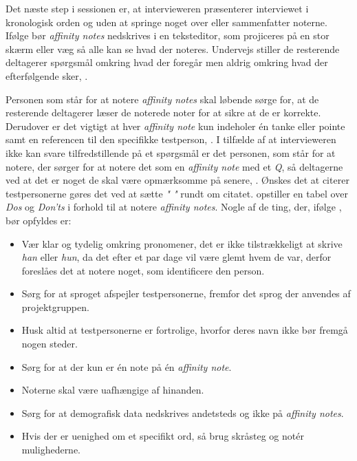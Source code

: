 Det næste step i sessionen er, at intervieweren præsenterer interviewet i kronologisk orden og uden at springe noget over eller sammenfatter noterne. Ifølge \textcite[s. 113]{Book:CIInterpretationSession} bør \textit{affinity notes} nedskrives i en teksteditor, som projiceres på en stor skærm eller væg så alle kan se hvad der noteres. Undervejs stiller de resterende deltagerer spørgsmål omkring hvad der foregår men aldrig omkring hvad der efterfølgende sker, \parencite[s. 114]{Book:CIInterpretationSession}.

Personen som står for at notere \textit{affinity notes} skal løbende sørge for, at de resterende deltagerer læser de noterede noter for at sikre at de er korrekte. Derudover er det vigtigt at hver \textit{affinity note} kun indeholer én tanke eller pointe samt en referencen til den specifikke testperson, \parencite[s. 115]{Book:CIInterpretationSession}. I tilfælde af at intervieweren ikke kan svare tilfredstillende på et spørgsmål er det personen, som står for at notere, der sørger for at notere det som en \textit{affinity note} med et \textit{Q}, så deltagerne ved at det er noget de skal være opmærksomme på senere, \parencite[s. 115]{Book:CIInterpretationSession}. Ønskes det at citerer testpersonerne gøres det ved at sætte \textit{" "} rundt om citatet. \textcite[s. 116]{Book:CIInterpretationSession} opstiller en tabel over \textit{Dos} og \textit{Don'ts} i forhold til at notere \textit{affinity notes}. Nogle af de ting, der, ifølge \textcite[s. 116]{Book:CIInterpretationSession}, bør opfyldes er:\blankline
%
\begin{itemize}
  \item Vær klar og tydelig omkring pronomener, det er ikke tilstrækkeligt at skrive \textit{han} eller \textit{hun}, da det efter et par dage vil være glemt hvem de var, derfor foreslåes det at notere noget, som identificere den person.
  \item Sørg for at sproget afspejler testpersonerne, fremfor det sprog der anvendes af projektgruppen.
  \item  Husk altid at testpersonerne er fortrolige, hvorfor deres navn ikke bør fremgå nogen steder. 
  \item Sørg for at der kun er én note på én \textit{affinity note}.
  \item Noterne skal være uafhængige af hinanden. 
  \item Sørg for at demografisk data nedskrives andetsteds og ikke på \textit{affinity notes}. 
  \item Hvis der er uenighed om et specifikt ord, så brug skråsteg og notér mulighederne.\blankline
\end{itemize}
